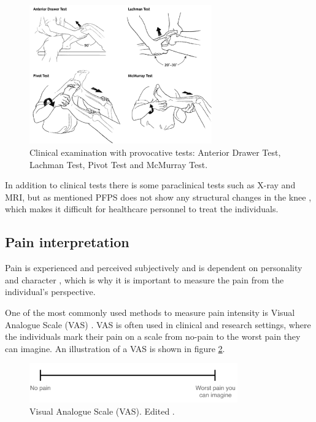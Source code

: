 \begin{figure} [H]
\centering
\includegraphics[width=0.7\textwidth]{figures/kneetest}
\caption{Clinical examination with provocative tests: Anterior Drawer Test, Lachman Test, Pivot Test and McMurray Test.\citep{Ghosh2010}}
\label{fig:kneetest}
\end{figure}


\noindent
In addition to clinical tests there is some paraclinical tests such as X-ray and MRI, but as mentioned PFPS does not show any structural changes in the knee \citep{Petersen2013}, which makes it difficult for healthcare personnel to treat the individuals. 

\subsection{Pain interpretation}
Pain is experienced and perceived subjectively \citep{IASP2012, Younger2009} and is dependent on personality and character \citep{Schmidt2013}, which is why it is important to measure the pain from the individual’s perspective.
 
\noindent
One of the most commonly used methods to measure pain intensity is Visual Analogue Scale (VAS) \citep{Valente2011}. VAS is often used in clinical and research settings, where the individuals mark their pain on a scale from no-pain to the worst pain they can imagine.\citep{Haefeli2005} An illustration of a VAS is shown in figure \ref{fig:VAS}.

\begin{figure} [H]
\centering
\includegraphics[width=0.8\textwidth]{figures/VAS}
\caption{Visual Analogue Scale (VAS). Edited \citep{Haefeli2005}.}
\label{fig:VAS}
\end{figure}

